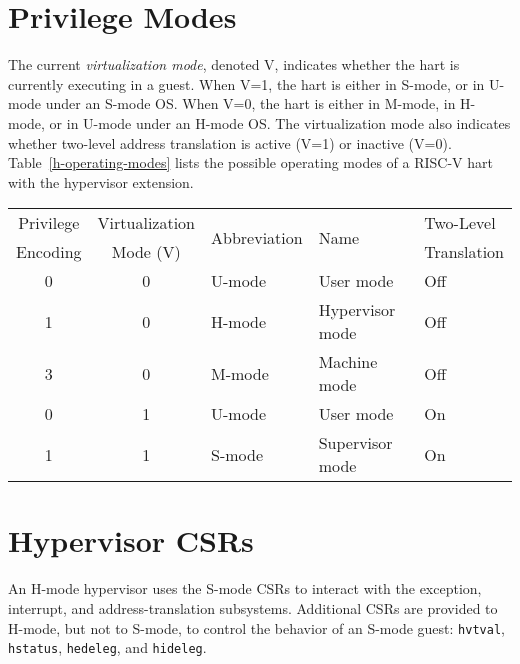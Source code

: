 \section{Privilege Modes}

The current {\em virtualization mode}, denoted V, indicates whether the hart
is currently executing in a guest.  When V=1, the hart is either in S-mode, or
in U-mode under an S-mode OS.  When V=0, the hart is either in M-mode, in
H-mode, or in U-mode under an H-mode OS.  The virtualization mode also
indicates whether two-level address translation is active (V=1) or inactive
(V=0).  Table~\ref{h-operating-modes} lists the possible operating modes of
a RISC-V hart with the hypervisor extension.

\begin{table*}[h!]
\begin{center}
\begin{tabular}{|c|c||l|l|l|}
  \hline
   Privilege & Virtualization & \multirow{2}{*}{Abbreviation} & \multirow{2}{*}{Name} & Two-Level \\
   Encoding  & Mode (V)       &                               &                       & Translation \\ \hline
   0         & 0              & U-mode  & User mode & Off \\
   1         & 0              & H-mode  & Hypervisor mode & Off \\
   3         & 0              & M-mode  & Machine mode & Off \\
   0         & 1              & U-mode  & User mode & On \\
   1         & 1              & S-mode  & Supervisor mode & On \\
  \hline
 \end{tabular}
\end{center}
\caption{Operating modes with the hypervisor extension.}
\label{h-operating-modes}
\end{table*}

\section{Hypervisor CSRs}

An H-mode hypervisor uses the S-mode CSRs to interact with the exception,
interrupt, and address-translation subsystems.
Additional CSRs are provided to H-mode, but not to S-mode, to control
the behavior of an S-mode guest:
{\tt hvtval}, {\tt hstatus}, {\tt hedeleg}, and
{\tt hideleg}.

